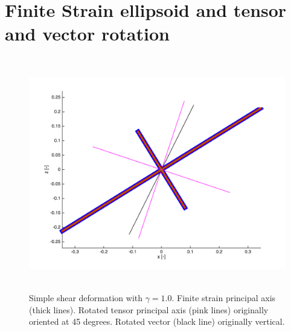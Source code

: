 \documentclass[12pt,english,openany]{scrbook}
\begin{document}
\section{Finite Strain ellipsoid and tensor and vector rotation}


\begin{figure}[ht!]
\centerline{\includegraphics[height=4.0in]{./Figures/FiniteStrainRotation}}
\caption{Simple shear deformation with $\gamma = 1.0$. Finite strain principal axis (thick lines). Rotated tensor principal axis (pink lines) originally oriented at 45 degrees. Rotated vector (black line) originally vertical.}
\label{FiniteStrainRotation}
\end{figure}


 
\end{document}
